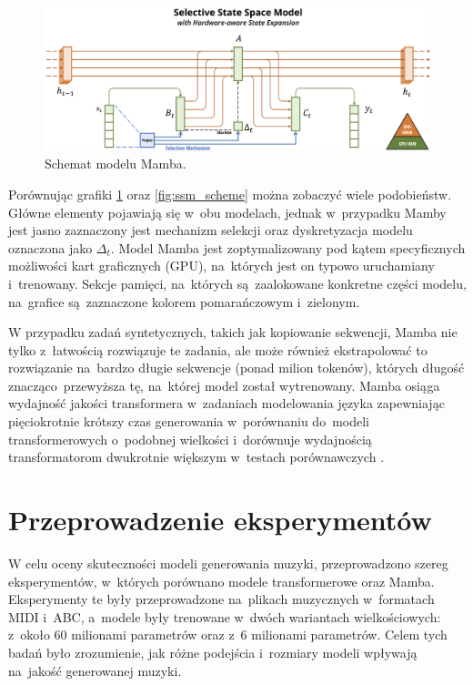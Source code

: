 \documentclass[data-science]{agh-wi} %
\begin{document}
\begin{figure}[ht!]
    \begin{center}
        \includegraphics[width=0.9\linewidth]{img/mamba1.png}
    \end{center}
    \caption{Schemat modelu Mamba.}
    \label{fig:mamba1}
\end{figure}

Porównując grafiki \ref*{fig:mamba1} oraz \ref*{fig:ssm_scheme} można zobaczyć wiele podobieństw. Główne elementy pojawiają się w~obu modelach, jednak w~przypadku Mamby jest jasno zaznaczony jest mechanizm selekcji oraz dyskretyzacja modelu oznaczona jako $\Delta_t$. Model Mamba jest zoptymalizowany pod kątem specyficznych możliwości kart graficznych (GPU), na~których jest on typowo uruchamiany i~trenowany. Sekcje pamięci, na~których są~zaalokowane konkretne części modelu, na~grafice są~zaznaczone kolorem pomarańczowym i~zielonym.

W przypadku zadań syntetycznych, takich jak kopiowanie sekwencji, Mamba nie tylko z~łatwością rozwiązuje te zadania, ale może również ekstrapolować to rozwiązanie na~bardzo długie sekwencje (ponad milion tokenów), których długość znacząco~przewyższa tę, na~której model został wytrenowany. Mamba osiąga wydajność jakości transformera w~zadaniach modelowania języka zapewniając pięciokrotnie krótszy czas generowania w~porównaniu do~modeli transformerowych o~podobnej wielkości i~dorównuje wydajnością transformatorom dwukrotnie większym w~testach porównawczych \cite{mamba}.

\chapter{Przeprowadzenie eksperymentów}
W celu oceny skuteczności modeli generowania muzyki, przeprowadzono szereg eksperymentów, w~których porównano modele transformerowe oraz Mamba. Eksperymenty te były przeprowadzone na~plikach muzycznych w~formatach MIDI i~ABC, a~modele były trenowane w~dwóch wariantach wielkościowych: z~około 60 milionami parametrów oraz z~6 milionami parametrów. Celem tych badań było zrozumienie, jak różne podejścia i~rozmiary modeli wpływają na~jakość generowanej muzyki.
\end{document}

